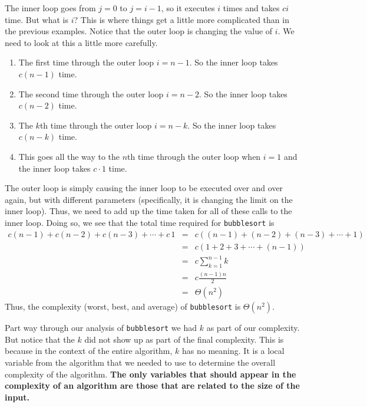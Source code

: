 \begin{exa}
\begin{sol}
The inner loop goes from $j=0$ to $j=i-1$, 
so it executes $i$ times and takes $ci$ time.  
But what is $i$?  This is where things
get a little more complicated than in the previous examples.  
Notice that the outer loop is changing the value of $i$.  
We need to look at this a little more carefully.
\begin{enumerate}
\item 
The first time through the outer loop $i=n-1$.  
So the inner loop takes $c(n-1)$ time.
\item
The second time through the outer loop $i=n-2$.  
So the inner loop takes $c(n-2)$ time.
\item
The $k$th time through the outer loop $i=n-k$.  
So the inner loop takes $c(n-k)$ time.
\item
This goes all the way to the $n$th time through the outer loop when 
$i=1$ and the inner loop takes $c\cdot 1$ time.
\end{enumerate}
The outer loop is simply causing the inner loop to be executed over and over again,
but with different parameters (specifically, it is changing the limit on the inner loop).  
Thus, we need to add up the time taken for all of these calls to the inner loop.  
Doing so, we see that the total time required for \verb+bubblesort+ is 
\begin{eqnarray*}
c(n{-}1)+c(n{-}2)+c(n{-}3)+\cdots+c\, 1&=&c( (n{-}1) + (n{-}2) + (n{-}3)+\cdots + 1)\\
&=&c(1+2+3+\cdots+(n-1))\\
&=&c\sum_{k=1}^{n-1}k\\
&=&c\frac{(n-1)n}{2}\\
&=&\Theta(n^2)
\end{eqnarray*}
Thus, the complexity (worst, best, and average) of \verb+bubblesort+ is $\Theta(n^2)$.
\end{sol}
\end{exa}

\begin{rem}
Part way through our analysis of \verb+bubblesort+ we had $k$ as part of our complexity.
But notice that the $k$ did not show up as part of the final complexity.  This is because
in the context of the entire algorithm, $k$ has no meaning.  It is a local variable from the 
algorithm that we needed to use to determine the overall complexity of the algorithm.
{\bf The only variables that should appear in the complexity of an 
algorithm are those that are related to the size of the input.}
\end{rem}

